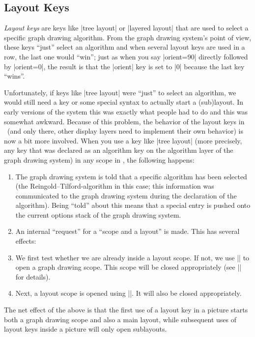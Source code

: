 \subsection{Layout Keys}

\emph{Layout keys} are keys like |tree layout| or |layered layout| that are
used to select a specific graph drawing algorithm. From the graph drawing
system's point of view, these keys ``just'' select an algorithm and when
several layout keys are used in a row, the last one would ``win''; just as when
you say |orient=90| directly followed by |orient=0|, the result is that the
|orient| key is set to |0| because the last key ``wins''.

Unfortunately, if keys like |tree layout| were ``just'' to select an algorithm,
we would still need a key or some special syntax to actually start a
(sub)layout. In early versions of the system this was exactly what people had
to do and this was somewhat awkward. Because of this problem, the behavior of
the layout keys in \pgfname\ (and only there, other display layers need to
implement their own behavior) is now a bit more involved. When you use a key
like |tree layout| (more precisely, any key that was declared as an algorithm
key on the algorithm layer of the graph drawing system) in any scope in
\pgfname, the following happens:
%
\begin{enumerate}
    \item The graph drawing system is told that a specific algorithm has been
        selected (the Reingold--Tilford-algorithm in this case; this
        information was communicated to the graph drawing system during the
        declaration of the algorithm). Being ``told'' about this means that a
        special entry is pushed onto the current options stack of the graph
        drawing system.
    \item An internal ``request'' for a ``scope and a layout'' is made. This
        has several effects:
    \item We first test whether we are already inside a layout scope. If not,
        we use |\pgfgdbeginscope| to open a graph drawing scope. This scope
        will be closed appropriately (see |\pgfgdsetrequestcallback| for
        details).
    \item Next, a layout scope is opened using |\pgfgdbeginlayout|. It will
        also be closed appropriately.
\end{enumerate}

The net effect of the above is that the first use of a layout key in a picture
starts both a graph drawing scope and also a main layout, while subsequent uses
of layout keys inside a picture will only open sublayouts.

